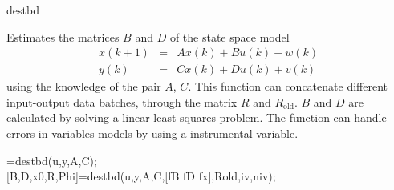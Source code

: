 \documentclass{book}
\begin{document}
\begin{command}{destbd}
  \begin{purpose}
    Estimates the matrices $B$ and $D$ of the state space model
    \begin{eqnarray*}
      x(k+1) & = &  A x(k) + B u(k) +w(k)\\
      y(k) & = & C x(k) + D u(k) + v(k)
    \end{eqnarray*}
    using the knowledge of the pair $A$, $C$. This function can
    concatenate different input-output data batches, through the
    matrix $R$ and $R_{\mbox{old}}$. $B$ and $D$ are calculated by
    solving a linear least squares problem. The function can handle
    errors-in-variables models by using a instrumental variable.
  \end{purpose}
  \begin{syntax}
    [B,D]=destbd(u,y,A,C);\\[0pt]
    [B,D,x0,R,Phi]=destbd(u,y,A,C,[fB fD fx],Rold,iv,niv);
  \end{syntax}


\end{command}
\end{document}
